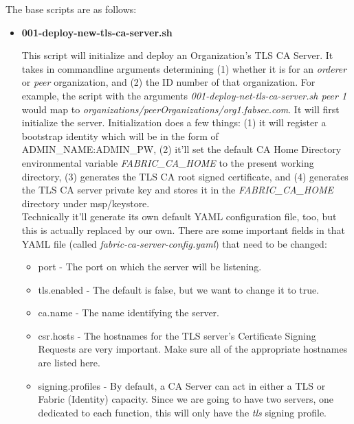 			The base scripts are as follows:
			\begin{itemize}
				\item \textbf{001-deploy-new-tls-ca-server.sh}
				
					\hspace{10mm}This script will initialize and deploy an Organization's TLS CA Server. It takes in commandline arguments determining (1) whether it is for an \textit{orderer} or \textit{peer} organization, and (2) the ID number of that organization. For example, the script with the arguments \textit{001-deploy-net-tls-ca-server.sh peer 1} would map to \textit{organizations/peerOrganizations/org1.fabsec.com}. It will first initialize the server. Initialization does a few things: (1) it will register a bootstrap identity which will be in the form of ADMIN\_NAME:ADMIN\_PW, (2) it'll set the default CA Home Directory environmental variable \textit{FABRIC\_CA\_HOME} to the present working directory, (3) generates the TLS CA root signed certificate, and (4) generates the TLS CA server private key and stores it in the \textit{FABRIC\_CA\_HOME} directory under msp/keystore.\\
					
					\hspace{10mm}Technically it'll generate its own default YAML configuration file, too, but this is actually replaced by our own. There are some important fields in that YAML file (called \textit{fabric-ca-server-config.yaml}) that need to be changed:
						\begin{itemize}
							\item port - The port on which the server will be listening.
							\item tls.enabled - The default is false, but we want to change it to true.
							
							\item ca.name - The name identifying the server.

							\item csr.hosts - The hostnames for the TLS server's Certificate Signing Requests are very important. Make sure all of the appropriate hostnames are listed here.
							
							\item signing.profiles - By default, a CA Server can act in either a TLS or Fabric (Identity) capacity. Since we are going to have two servers, one dedicated to each function, this will only have the \textit{tls} signing profile.
						\end{itemize}
						

\end{itemize}
